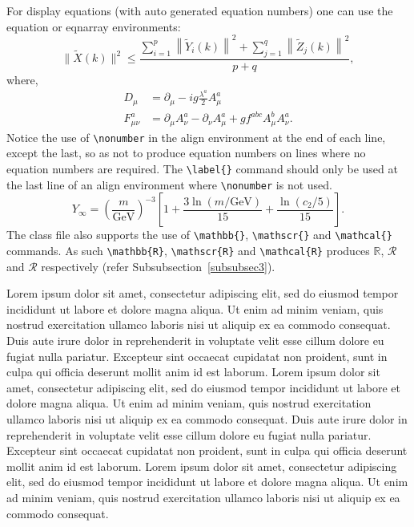 \documentclass[unnumsec,webpdf,modern,large]{oup-authoring-template}%
\theoremstyle{thmstyleone}%
\theoremstyle{thmstyletwo}%
\theoremstyle{thmstylethree}%
\begin{document}
For display equations (with auto generated equation numbers)
one can use the equation or eqnarray environments:
\begin{equation}
\|\tilde{X}(k)\|^2 \leq\frac{\sum\limits_{i=1}^{p}\left\|\tilde{Y}_i(k)\right\|^2+\sum\limits_{j=1}^{q}\left\|\tilde{Z}_j(k)\right\|^2 }{p+q},\label{eq1}
\end{equation}
where,
\begin{align}
D_\mu &=  \partial_\mu - ig \frac{\lambda^a}{2} A^a_\mu \nonumber \\
F^a_{\mu\nu} &= \partial_\mu A^a_\nu - \partial_\nu A^a_\mu + g f^{abc} A^b_\mu A^a_\nu.\label{eq2}
\end{align}
Notice the use of \verb+\nonumber+ in the align environment at the end
of each line, except the last, so as not to produce equation numbers on
lines where no equation numbers are required. The \verb+\label{}+ command
should only be used at the last line of an align environment where
\verb+\nonumber+ is not used.
\begin{equation}
Y_\infty = \left( \frac{m}{\textrm{GeV}} \right)^{-3}
    \left[ 1 + \frac{3 \ln(m/\textrm{GeV})}{15}
    + \frac{\ln(c_2/5)}{15} \right].
\end{equation}
The class file also supports the use of \verb+\mathbb{}+, \verb+\mathscr{}+ and
\verb+\mathcal{}+ commands. As such \verb+\mathbb{R}+, \verb+\mathscr{R}+
and \verb+\mathcal{R}+ produces $\mathbb{R}$, $\mathscr{R}$ and $\mathcal{R}$
respectively (refer Subsubsection~\ref{subsubsec3}).


Lorem ipsum dolor sit amet, consectetur adipiscing elit, sed do
eiusmod tempor incididunt ut labore et dolore magna aliqua. Ut enim ad minim veniam, quis nostrud exercitation ullamco laboris nisi ut aliquip ex ea commodo consequat. Duis aute irure dolor in reprehenderit in voluptate velit esse cillum dolore eu fugiat nulla pariatur. Excepteur sint occaecat cupidatat non proident, sunt in culpa qui officia deserunt mollit anim id est laborum. Lorem ipsum dolor sit amet, consectetur adipiscing elit, sed do
eiusmod tempor incididunt ut labore et dolore magna aliqua. Ut enim ad minim veniam, quis nostrud exercitation ullamco laboris nisi ut aliquip ex ea commodo consequat. Duis aute irure dolor in reprehenderit in voluptate velit esse cillum dolore eu fugiat nulla pariatur. Excepteur sint occaecat cupidatat non proident, sunt in culpa qui officia deserunt mollit anim id est laborum. 
Lorem ipsum dolor sit amet, consectetur adipiscing elit, sed do
eiusmod tempor incididunt ut labore et dolore magna aliqua. Ut enim ad minim veniam, quis nostrud exercitation ullamco laboris nisi ut aliquip ex ea commodo consequat. 
\end{document}
